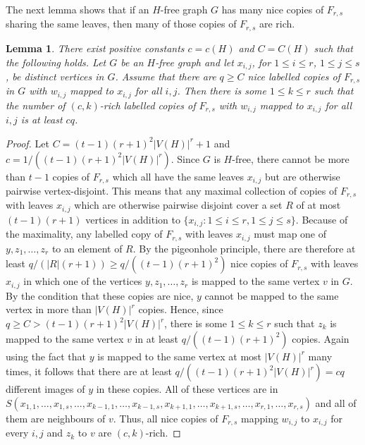 \documentclass[11pt]{article}
\numberwithin{equation}{section}
\newtheorem{lemma}[theorem]{\bf Lemma}
\theoremstyle{definition}
\begin{document}
The next lemma shows that if an $H$-free graph $G$ has many nice copies of $F_{r,s}$ sharing the same leaves, then many of those copies of $F_{r,s}$ are rich.

\begin{lemma} \label{lem:rich with fixed leaves}
	There exist positive constants $c=c(H)$ and $C=C(H)$ such that the following holds. Let $G$ be an $H$-free graph and let $x_{i,j}$, for $1\leq i\leq r$, $1\leq j\leq s$, be distinct vertices in $G$. Assume that there are $q\geq C$ nice labelled copies of $F_{r,s}$ in $G$ with $w_{i,j}$ mapped to $x_{i,j}$ for all $i,j$. Then there is some $1\leq k\leq r$ such that the number of $(c,k)$-rich labelled copies of $F_{r,s}$ with $w_{i,j}$ mapped to $x_{i,j}$ for all $i, j$ is at least $cq$.
\end{lemma}

\begin{proof}
    Let $C=(t-1)(r+1)^2|V(H)|^r+1$ and $c=1/((t-1)(r+1)^2|V(H)|^r)$. Since $G$ is $H$-free, there cannot be more than $t-1$ copies of $F_{r,s}$ which all have the same leaves $x_{i,j}$ but are otherwise pairwise vertex-disjoint. This means that any maximal collection of copies of $F_{r,s}$ with leaves $x_{i,j}$ which are otherwise pairwise disjoint cover a set $R$ of at most $(t-1)(r+1)$ vertices in addition to $\{x_{i,j}:1\leq i\leq r,1\leq j\leq s\}$. Because of the maximality, any labelled copy of $F_{r,s}$ with leaves $x_{i,j}$ must map one of $y,z_1,\dots,z_r$ to an element of $R$. By the pigeonhole principle, there are therefore at least $q/(|R|(r+1))\geq q/((t-1)(r+1)^2)$ nice copies of $F_{r,s}$ with leaves $x_{i,j}$ in which one of the vertices $y,z_1,\dots,z_r$ is mapped to the same vertex $v$ in $G$. By the condition that these copies are nice, $y$ cannot be mapped to the same vertex in more than $|V(H)|^r$ copies. Hence, since $q\geq C>(t-1)(r+1)^2|V(H)|^r$, 
    there is some $1\leq k\leq r$ such that $z_k$ is mapped to the same vertex $v$ in at least $q/((t-1)(r+1)^2)$ copies. Again using the fact that $y$ is mapped to the same vertex at most $|V(H)|^r$ many times, it follows that there are at least $q/((t-1)(r+1)^2|V(H)|^r)=cq$ different images of $y$ in these copies. All of these vertices are in $S(x_{1,1},\dots,x_{1,s},\dots,x_{k-1,1},\dots,x_{k-1,s},x_{k+1,1},\dots,x_{k+1,s},\dots,x_{r,1},\dots,x_{r,s})$ and all of them are neighbours of $v$. Thus, all nice copies of $F_{r,s}$ mapping $w_{i,j}$ to $x_{i,j}$ for every $i,j$ and $z_k$ to $v$ are $(c,k)$-rich.
\end{proof}
\end{document}
